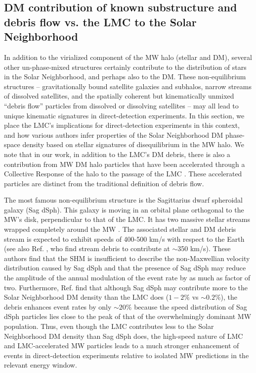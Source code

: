 \documentclass[letterpaper,11pt]{article}
\begin{document}
\subsection{DM contribution of known substructure and debris flow vs. the LMC to the Solar Neighborhood} 

In addition to the virialized component of the MW halo (stellar and DM), several other un-phase-mixed structures certainly contribute to the distribution of stars in the Solar Neighborhood, and perhaps also to the DM.  These non-equilibrium structures -- gravitationally bound satellite galaxies and subhalos, narrow streams of dissolved satellites, and the spatially coherent but kinematically unmixed ``debris flow'' particles from dissolved or dissolving satellites \cite{Lisanti:2011as} -- may all lead to unique kinematic signatures in direct-detection experiments.  In this section, we place the LMC's implications for direct-detection experiments in this context, and how various authors infer properties of the Solar Neighborhood DM phase-space density based on stellar signatures of disequilibrium in the MW halo. We note that in our work, in addition to the LMC's DM debris, there is also a contribution from MW DM halo particles that have been accelerated through a Collective Response of the halo 
to the passage of the LMC \citep{G19}. These accelerated particles are distinct from the traditional definition of 
debris flow.


The most famous non-equilibrium structure is the Sagittarius dwarf spheroidal galaxy (Sag dSph).  This galaxy is moving in an orbital plane orthogonal to the 
MW's disk, perpendicular to that of the LMC.  It has two massive stellar streams wrapped completely around the MW \cite{Newberg:2001sx,Ibata2001,Majewski2003}. 
The associated stellar and DM debris stream is expected to exhibit speeds of 
400-500 km/s \cite{Purcell:2012sh} with respect to the Earth (see also Ref. \cite{Freese:2013,Freese:2003tt}, who find stream debris to contribute at $\sim$350 km/s). These authors find that
the SHM is insufficient to describe the non-Maxwellian velocity distribution caused by Sag dSph
and that the presence of Sag dSph may reduce the amplitude of the annual modulation of the event rate by as much as factor of two.
Furthermore, Ref. \cite{Purcell:2012sh} find that although Sag dSph may contribute more to the Solar Neighborhood DM density than the LMC does ($1-2\%$ vs $\sim 0.2\%$), the debris enhances event rates by only $\sim 20\%$ because the speed distribution of Sag dSph particles lies close to the peak of that of the overwhelmingly dominant MW population.   Thus, even though the LMC contributes less to the Solar Neighborhood DM density than Sag dSph does, the high-speed nature of LMC and LMC-accelerated MW particles leads to a much stronger enhancement of events in direct-detection experiments relative to isolated MW predictions in the relevant energy window.
\end{document}
